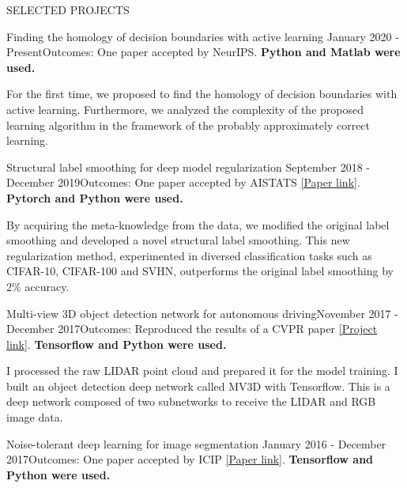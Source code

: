 \documentclass{resume} %
\begin{document}
\begin{rSection}{SELECTED PROJECTS}
\begin{rSubsection}{Finding the homology of decision boundaries with active learning} {January 2020 - Present}{Outcomes: One paper accepted by NeurIPS. \textbf{Python and Matlab were used.}}{}
\item For the first time, we proposed to find the homology of decision boundaries with active learning. Furthermore, we analyzed the complexity of the proposed learning algorithm in the framework of the probably approximately correct learning.
\end{rSubsection}  
\vspace{-0.1cm}
\begin{rSubsection}{Structural label smoothing for  deep model regularization} {September 2018 - December 2019}{Outcomes: One paper accepted by AISTATS \href{http://proceedings.mlr.press/v108/li20e/li20e.pdf}{[Paper link]}. \textbf{Pytorch and Python were used.}}{}
\item By acquiring the meta-knowledge from the data, we modified the original label smoothing and developed a novel structural label smoothing. This new regularization method, experimented in diversed classification tasks such as CIFAR-10, CIFAR-100 and SVHN, outperforms the original label smoothing by  2\% accuracy.
\end{rSubsection}  
\begin{rSubsection}{Multi-view 3D object detection network for autonomous driving}{November 2017 - December 2017}{Outcomes: Reproduced the results of a CVPR paper \href{https://github.com/wayne0908/Multi-View-3D-Object-Detection-Network-for-Autonomous-Driving}{[Project link]}. \textbf{Tensorflow and Python were used.}}{} 
\item I processed the raw LIDAR point cloud and prepared it for the model training. I built an object detection deep network called MV3D with Tensorflow. This is a deep network composed of two subnetworks to receive the LIDAR and RGB image data. \end{rSubsection}
\vspace{-0.1cm}
\begin{rSubsection}{Noise-tolerant deep learning for image segmentation} {January 2016 - December 2017}{Outcomes: One paper accepted by ICIP \href{https://ieeexplore.ieee.org/stamp/stamp.jsp?tp=&arnumber=8296848}{[Paper link]}. \textbf{Tensorflow and Python were used.}}{}

\end{rSubsection}
\end{rSection}
\end{document}
